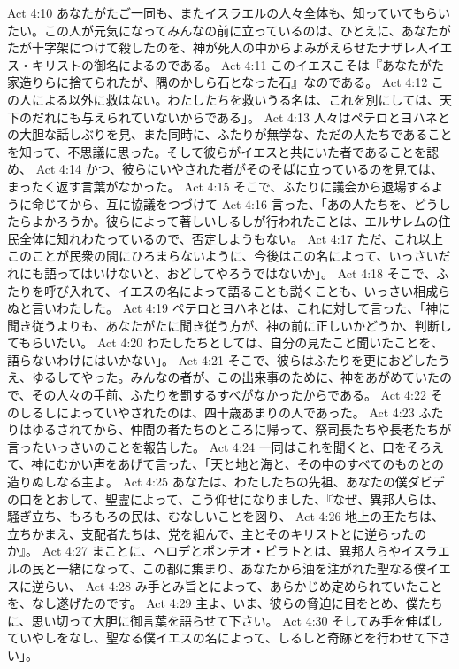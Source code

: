 Act 4:10  あなたがたご一同も、またイスラエルの人々全体も、知っていてもらいたい。この人が元気になってみんなの前に立っているのは、ひとえに、あなたがたが十字架につけて殺したのを、神が死人の中からよみがえらせたナザレ人イエス・キリストの御名によるのである。
Act 4:11  このイエスこそは『あなたがた家造りらに捨てられたが、隅のかしら石となった石』なのである。
Act 4:12  この人による以外に救はない。わたしたちを救いうる名は、これを別にしては、天下のだれにも与えられていないからである」。
Act 4:13  人々はペテロとヨハネとの大胆な話しぶりを見、また同時に、ふたりが無学な、ただの人たちであることを知って、不思議に思った。そして彼らがイエスと共にいた者であることを認め、
Act 4:14  かつ、彼らにいやされた者がそのそばに立っているのを見ては、まったく返す言葉がなかった。
Act 4:15  そこで、ふたりに議会から退場するように命じてから、互に協議をつづけて
Act 4:16  言った、「あの人たちを、どうしたらよかろうか。彼らによって著しいしるしが行われたことは、エルサレムの住民全体に知れわたっているので、否定しようもない。
Act 4:17  ただ、これ以上このことが民衆の間にひろまらないように、今後はこの名によって、いっさいだれにも語ってはいけないと、おどしてやろうではないか」。
Act 4:18  そこで、ふたりを呼び入れて、イエスの名によって語ることも説くことも、いっさい相成らぬと言いわたした。
Act 4:19  ペテロとヨハネとは、これに対して言った、「神に聞き従うよりも、あなたがたに聞き従う方が、神の前に正しいかどうか、判断してもらいたい。
Act 4:20  わたしたちとしては、自分の見たこと聞いたことを、語らないわけにはいかない」。
Act 4:21  そこで、彼らはふたりを更におどしたうえ、ゆるしてやった。みんなの者が、この出来事のために、神をあがめていたので、その人々の手前、ふたりを罰するすべがなかったからである。
Act 4:22  そのしるしによっていやされたのは、四十歳あまりの人であった。
Act 4:23  ふたりはゆるされてから、仲間の者たちのところに帰って、祭司長たちや長老たちが言ったいっさいのことを報告した。
Act 4:24  一同はこれを聞くと、口をそろえて、神にむかい声をあげて言った、「天と地と海と、その中のすべてのものとの造りぬしなる主よ。
Act 4:25  あなたは、わたしたちの先祖、あなたの僕ダビデの口をとおして、聖霊によって、こう仰せになりました、『なぜ、異邦人らは、騒ぎ立ち、もろもろの民は、むなしいことを図り、
Act 4:26  地上の王たちは、立ちかまえ、支配者たちは、党を組んで、主とそのキリストとに逆らったのか』。
Act 4:27  まことに、ヘロデとポンテオ・ピラトとは、異邦人らやイスラエルの民と一緒になって、この都に集まり、あなたから油を注がれた聖なる僕イエスに逆らい、
Act 4:28  み手とみ旨とによって、あらかじめ定められていたことを、なし遂げたのです。
Act 4:29  主よ、いま、彼らの脅迫に目をとめ、僕たちに、思い切って大胆に御言葉を語らせて下さい。
Act 4:30  そしてみ手を伸ばしていやしをなし、聖なる僕イエスの名によって、しるしと奇跡とを行わせて下さい」。
